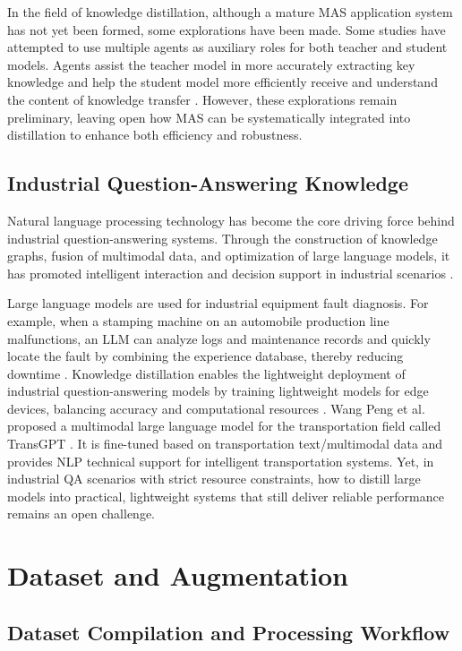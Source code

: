 \documentclass[preprint,12pt]{elsarticle}
\begin{document}
In the field of knowledge distillation, although a mature MAS application system has not yet been formed, some explorations have been made. Some studies have attempted to use multiple agents as auxiliary roles for both teacher and student models. Agents assist the teacher model in more accurately extracting key knowledge and help the student model more efficiently receive and understand the content of knowledge transfer \cite{Bo2024}. However, these explorations remain preliminary, leaving open how MAS can be systematically integrated into distillation to enhance both efficiency and robustness.

\subsection{Industrial Question-Answering Knowledge}

Natural language processing technology has become the core driving force behind industrial question-answering systems. Through the construction of knowledge graphs, fusion of multimodal data, and optimization of large language models, it has promoted intelligent interaction and decision support in industrial scenarios \cite{Jiao2025,Kojima2022}.

Large language models are used for industrial equipment fault diagnosis. For example, when a stamping machine on an automobile production line malfunctions, an LLM can analyze logs and maintenance records and quickly locate the fault by combining the experience database, thereby reducing downtime \cite{Meng2024}. Knowledge distillation enables the lightweight deployment of industrial question-answering models by training lightweight models for edge devices, balancing accuracy and computational resources \cite{Alam2020}. Wang Peng et al. proposed a multimodal large language model for the transportation field called TransGPT \cite{Wang2024b}. It is fine-tuned based on transportation text/multimodal data and provides NLP technical support for intelligent transportation systems. Yet, in industrial QA scenarios with strict resource constraints, how to distill large models into practical, lightweight systems that still deliver reliable performance remains an open challenge.

\section{Dataset and Augmentation}
\subsection{Dataset Compilation and Processing Workflow}
\label{sec:3.1}
\end{document}

